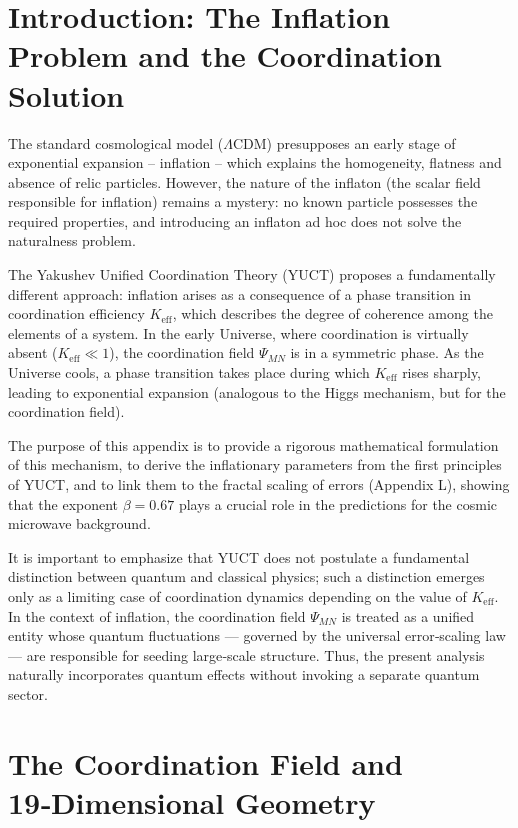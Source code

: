 \documentclass[12pt]{article}
\theoremstyle{remark}
\newcommand{\Keff}{K_{\mathrm{eff}}}
\begin{document}
	\section{Introduction: The Inflation Problem and the Coordination Solution}
	\label{sec:intro}
	
	The standard cosmological model ($\Lambda$CDM) presupposes an early stage of exponential expansion – inflation – which explains the homogeneity, flatness and absence of relic particles. However, the nature of the inflaton (the scalar field responsible for inflation) remains a mystery: no known particle possesses the required properties, and introducing an inflaton ad hoc does not solve the naturalness problem.
	
	The Yakushev Unified Coordination Theory (YUCT) proposes a fundamentally different approach: inflation arises as a consequence of a phase transition in coordination efficiency $\Keff$, which describes the degree of coherence among the elements of a system. In the early Universe, where coordination is virtually absent ($\Keff \ll 1$), the coordination field $\Psi_{MN}$ is in a symmetric phase. As the Universe cools, a phase transition takes place during which $\Keff$ rises sharply, leading to exponential expansion (analogous to the Higgs mechanism, but for the coordination field).
	
	The purpose of this appendix is to provide a rigorous mathematical formulation of this mechanism, to derive the inflationary parameters from the first principles of YUCT, and to link them to the fractal scaling of errors (Appendix L), showing that the exponent $\beta = 0.67$ plays a crucial role in the predictions for the cosmic microwave background.
	
	It is important to emphasize that YUCT does not postulate a fundamental distinction between quantum and classical physics; such a distinction emerges only as a limiting case of coordination dynamics depending on the value of $K_{\mathrm{eff}}$. In the context of inflation, the coordination field $\Psi_{MN}$ is treated as a unified entity whose quantum fluctuations — governed by the universal error‑scaling law — are responsible for seeding large‑scale structure. Thus, the present analysis naturally incorporates quantum effects without invoking a separate quantum sector.
	
	\section{The Coordination Field and 19‑Dimensional Geometry}
	\label{sec:field}
	
\end{document}
